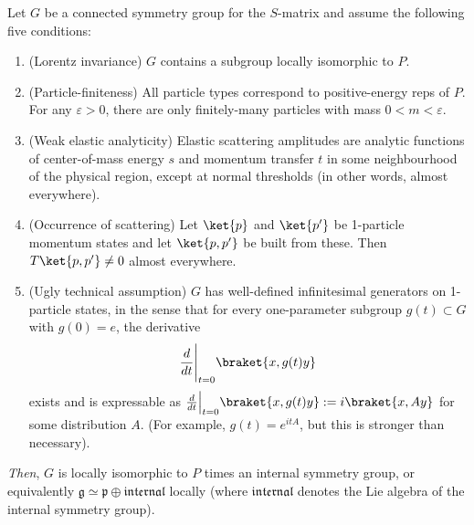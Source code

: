 \begin{theorem}
     Let $G$ be a connected symmetry group for the $S$-matrix and assume the following five conditions: \begin{enumerate}[\bfseries 1.]
    \item (Lorentz invariance)  $G$ contains a subgroup locally isomorphic to $  P$. 
    \item (Particle-finiteness)  All particle types correspond to positive-energy reps of $P$. For any $\varepsilon>0$, there are only finitely-many particles with mass $0 < m< \varepsilon$. 
    \item (Weak elastic analyticity)  Elastic scattering amplitudes are analytic functions of center-of-mass energy $s$ and momentum transfer $t$ in some neighbourhood of the physical region, except at normal thresholds (in other words, almost everywhere). 
    \item (Occurrence of scattering)  Let $\ket{p}$ and $\ket{p'}$ be 1-particle momentum states and let $\ket{p,p'}$ be built from these. Then $T\ket{p,p'}\neq 0$ almost everywhere.
    \item (Ugly technical assumption)   $G$ has well-defined infinitesimal generators on 1-particle states, in the sense that for every  one-parameter subgroup $g(t)\subset G$ with $g(0) = e$, the derivative  $$ \frac{d}{dt}\Bigg|_{t=0}\braket{x,g(t) y}    $$ exists and is expressable as  $ \frac{d}{dt}\Big|_{t=0}\braket{x,g(t) y}  := i\braket{x,Ay}$ for some distribution $A$. (For example, $g(t) = e^{it A}$, but this is stronger than necessary).
\end{enumerate} \textit{Then}, $G$ is locally isomorphic to $P$ times an internal symmetry group, or equivalently  $\mathfrak{g}\simeq\mathfrak{p}\oplus \mathfrak{internal}$ locally (where $\mathfrak{internal}$ denotes the Lie algebra of the internal symmetry group).  
 \end{theorem} 

